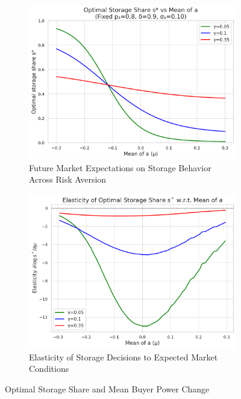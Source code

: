\begin{figure}[htbp]
    \centering
    \begin{subfigure}[b]{0.45\textwidth}
        \includegraphics[width=\textwidth]{figures/storage_share_buyer_power_simulation.png}
        \caption{Future Market Expectations on Storage Behavior Across Risk Aversion}
        \label{fig: buyer power and optimal storage}
    \end{subfigure}
    \hspace{0.05\textwidth}
    \begin{subfigure}[b]{0.45\textwidth}
        \includegraphics[width=\textwidth]{figures/elasticity_storage_buyer_power.png}
        \caption{Elasticity of Storage Decisions to Expected Market Conditions}
        \label{fig:elasticity of storage share to expected market conditions}
    \end{subfigure}
    \caption{Optimal Storage Share and Mean Buyer Power Change}
    \label{fig:wholefig}
\end{figure}


